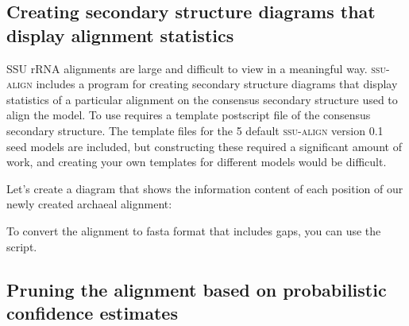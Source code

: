 \subsection{Creating secondary structure diagrams that display alignment statistics}

SSU rRNA alignments are large and difficult to view in a meaningful
way. \textsc{ssu-align} includes a program  for
creating secondary structure diagrams that display statistics of a
particular alignment on the consensus secondary structure used to
align the model. To use  requires a template
postscript file of the consensus secondary structure. The template
files for the 5 default \textsc{ssu-align} version 0.1 seed models are
included, but constructing these required a significant amount of
work, and creating your own templates for different models would be
difficult. 

Let's create a diagram that shows the information content of each
position of our newly created archaeal alignment:


To convert the alignment to fasta format that includes gaps, you can use the
 script. 

\subsection{Pruning the alignment based on probabilistic confidence
  estimates}


